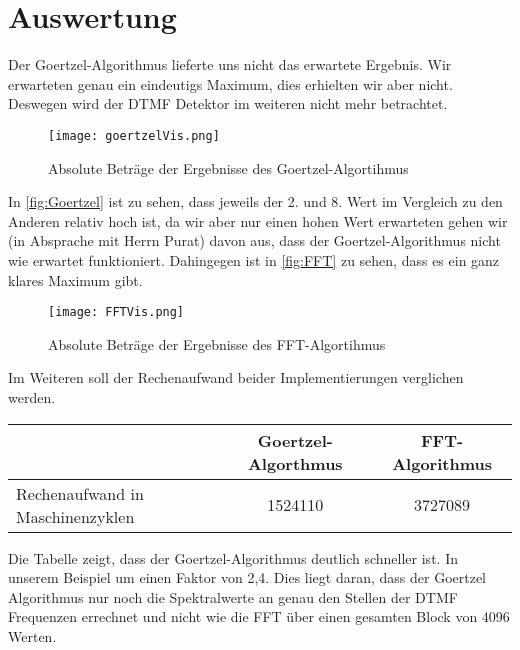 \section{Auswertung}
Der Goertzel-Algorithmus lieferte uns nicht das erwartete Ergebnis. Wir erwarteten genau ein eindeutigs Maximum, dies erhielten wir aber nicht. Deswegen wird der DTMF Detektor im weiteren nicht mehr betrachtet.
\begin{figure}[H]
	\texttt{[image: goertzelVis.png]}
  \caption{Absolute Beträge der Ergebnisse des Goertzel-Algortihmus}
  \label{fig:Goertzel}
\end{figure}
In \autoref{fig:Goertzel} ist zu sehen, dass jeweils der 2. und 8. Wert im Vergleich zu den Anderen relativ hoch ist, da wir aber nur einen hohen Wert erwarteten gehen wir (in Absprache mit Herrn Purat) davon aus, dass der Goertzel-Algorithmus nicht wie erwartet funktioniert.
Dahingegen ist in \autoref{fig:FFT} zu sehen, dass es ein ganz klares Maximum gibt.
\begin{figure}[H]
	\texttt{[image: FFTVis.png]}
  \caption{Absolute Beträge der Ergebnisse des FFT-Algortihmus}
  \label{fig:FFT}
\end{figure}
Im Weiteren soll der Rechenaufwand beider Implementierungen verglichen werden.
\begin{center}
	\begin{tabular}{l|c|c}
	 & Goertzel-Algorthmus & FFT-Algorithmus \\ \hline
	 Rechenaufwand in Maschinenzyklen & 1524110 & 3727089
	\end{tabular}
\end{center} 
Die Tabelle zeigt, dass der Goertzel-Algorithmus deutlich schneller ist. In unserem Beispiel um einen Faktor von 2,4. Dies liegt daran, dass der Goertzel Algorithmus nur noch die Spektralwerte an genau den Stellen der DTMF Frequenzen errechnet und nicht wie die FFT über einen gesamten Block von 4096 Werten.

